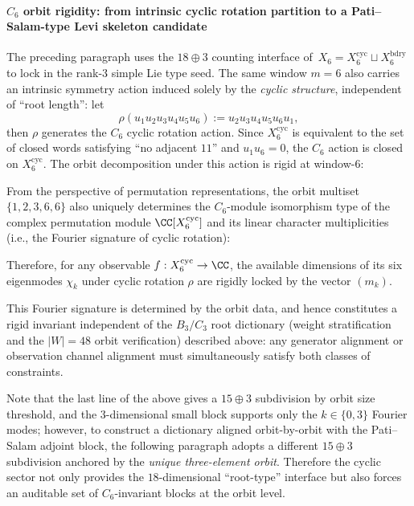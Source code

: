 \paragraph{\texorpdfstring{$C_6$}{C6} orbit rigidity: from intrinsic cyclic rotation partition to a Pati--Salam-type Levi skeleton candidate}
The preceding paragraph uses the \(18\oplus 3\) counting interface of \(\,X_6=X_6^{\mathrm{cyc}}\sqcup X_6^{\mathrm{bdry}}\) to lock in the rank-\(3\) simple Lie type seed.
The same window \(m=6\) also carries an intrinsic symmetry action induced solely by the \emph{cyclic structure}, independent of ``root length'': let
\[
\rho(u_1u_2u_3u_4u_5u_6):=u_2u_3u_4u_5u_6u_1,
\]
then \(\rho\) generates the \(C_6\) cyclic rotation action.
Since \(X_6^{\mathrm{cyc}}\) is equivalent to the set of closed words satisfying ``no adjacent \(11\)'' and \(u_1u_6=0\), the \(C_6\) action is closed on \(X_6^{\mathrm{cyc}}\).
The orbit decomposition under this action is rigid at window-6:


From the perspective of permutation representations, the orbit multiset \(\{1,2,3,6,6\}\) also uniquely determines the \(C_6\)-module isomorphism type of the complex permutation module \(\CC[X_6^{\mathrm{cyc}}]\) and its linear character multiplicities (i.e., the Fourier signature of cyclic rotation):

Therefore, for any observable \(f:X_6^{\mathrm{cyc}}\to\CC\), the available dimensions of its six eigenmodes \(\chi_k\) under cyclic rotation \(\rho\) are rigidly locked by the vector \((m_k)\).
\par
This Fourier signature is determined by the orbit data, and hence constitutes a rigid invariant independent of the \(B_3/C_3\) root dictionary (weight stratification and the \(|W|=48\) orbit verification) described above: any generator alignment or observation channel alignment must simultaneously satisfy both classes of constraints.
\par
Note that the last line of the above gives a \(15\oplus 3\) subdivision by orbit size threshold, and the \(3\)-dimensional small block supports only the \(k\in\{0,3\}\) Fourier modes; however, to construct a dictionary aligned orbit-by-orbit with the Pati--Salam adjoint block, the following paragraph adopts a different \(15\oplus 3\) subdivision anchored by the \emph{unique three-element orbit}.
Therefore the cyclic sector not only provides the \(18\)-dimensional ``root-type'' interface but also forces an auditable set of \(C_6\)-invariant blocks at the orbit level.

